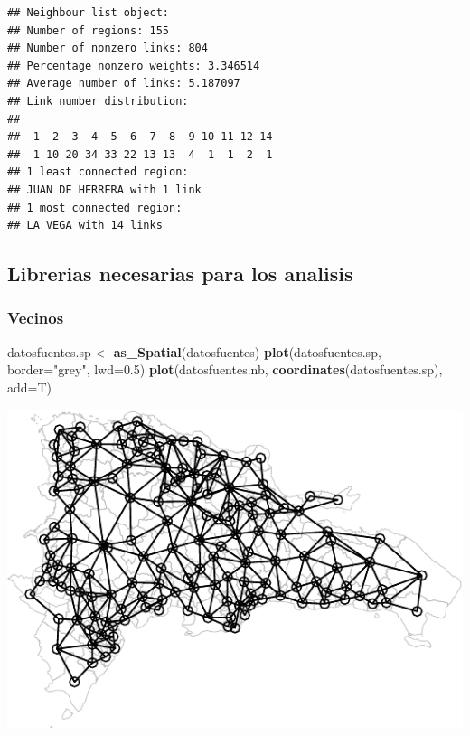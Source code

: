 \documentclass[11pt,]{article}
\newenvironment{Shaded}{\begin{snugshade}}{\end{snugshade}}
\newcommand{\KeywordTok}[1]{\textcolor[rgb]{0.13,0.29,0.53}{\textbf{#1}}}
\newcommand{\DataTypeTok}[1]{\textcolor[rgb]{0.13,0.29,0.53}{#1}}
\newcommand{\FloatTok}[1]{\textcolor[rgb]{0.00,0.00,0.81}{#1}}
\newcommand{\StringTok}[1]{\textcolor[rgb]{0.31,0.60,0.02}{#1}}
\newcommand{\NormalTok}[1]{#1}
\begin{document}
\begin{verbatim}
## Neighbour list object:
## Number of regions: 155 
## Number of nonzero links: 804 
## Percentage nonzero weights: 3.346514 
## Average number of links: 5.187097 
## Link number distribution:
## 
##  1  2  3  4  5  6  7  8  9 10 11 12 14 
##  1 10 20 34 33 22 13 13  4  1  1  2  1 
## 1 least connected region:
## JUAN DE HERRERA with 1 link
## 1 most connected region:
## LA VEGA with 14 links
\end{verbatim}

\subsection{Librerias necesarias para los
analisis}\label{librerias-necesarias-para-los-analisis-1}

\subsubsection{Vecinos}\label{vecinos-1}

\begin{Shaded}
\begin{Highlighting}[]
\NormalTok{datosfuentes.sp <-}\StringTok{ }\KeywordTok{as_Spatial}\NormalTok{(datosfuentes)}
\KeywordTok{plot}\NormalTok{(datosfuentes.sp, }\DataTypeTok{border=}\StringTok{"grey"}\NormalTok{, }\DataTypeTok{lwd=}\FloatTok{0.5}\NormalTok{)}
\KeywordTok{plot}\NormalTok{(datosfuentes.nb, }\KeywordTok{coordinates}\NormalTok{(datosfuentes.sp), }\DataTypeTok{add=}\NormalTok{T)}
\end{Highlighting}
\end{Shaded}

\includegraphics{proyecto_files/figure-latex/unnamed-chunk-3-1.pdf}
\end{document}
